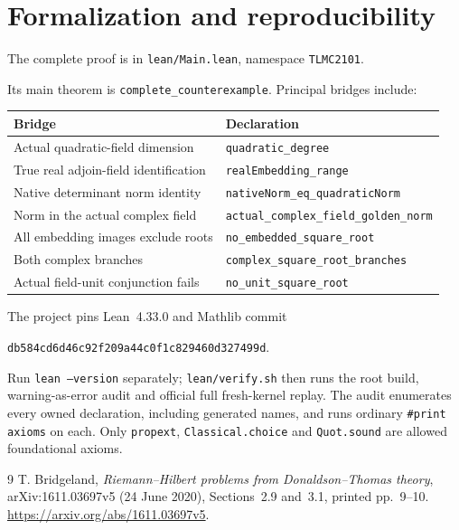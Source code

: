 \documentclass[10pt,a4paper]{article}
\begin{document}
\section*{Formalization and reproducibility}
The complete proof is in \texttt{lean/Main.lean}, namespace
\texttt{TLMC2101}.\par
Its main theorem is \texttt{complete\_counterexample}.
Principal bridges include:
\begin{center}
\begin{tabular}{ll}
\toprule
Bridge & Declaration\\
\midrule
Actual quadratic-field dimension & \texttt{quadratic\_degree}\\
True real adjoin-field identification & \texttt{realEmbedding\_range}\\
Native determinant norm identity & \texttt{nativeNorm\_eq\_quadraticNorm}\\
Norm in the actual complex field & \texttt{actual\_complex\_field\_golden\_norm}\\
All embedding images exclude roots & \texttt{no\_embedded\_square\_root}\\
Both complex branches & \texttt{complex\_square\_root\_branches}\\
Actual field-unit conjunction fails & \texttt{no\_unit\_square\_root}\\
\bottomrule
\end{tabular}
\end{center}
The project pins Lean~4.33.0 and Mathlib commit\par
\texttt{db584cd6d46c92f209a44c0f1c829460d327499d}.\par
Run \texttt{lean --version} separately; \texttt{lean/verify.sh} then runs
the root build, warning-as-error audit and official full fresh-kernel
replay. The audit enumerates every owned declaration, including generated
names, and runs ordinary \texttt{\#print axioms} on each.
Only \texttt{propext}, \texttt{Classical.choice} and \texttt{Quot.sound}
are allowed foundational axioms.

\begin{thebibliography}{9}
T. Bridgeland, \emph{Riemann--Hilbert problems from Donaldson--Thomas
theory}, arXiv:1611.03697v5 (24 June 2020), Sections~2.9 and~3.1,
printed pp.~9--10. \url{https://arxiv.org/abs/1611.03697v5}.
\end{thebibliography}
\end{document}
